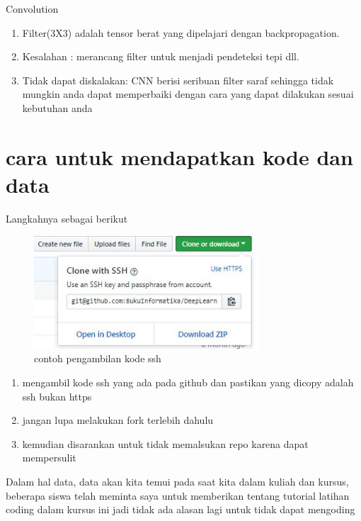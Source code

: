 Convolution
\begin{enumerate}
\item Filter(3X3) adalah tensor berat yang dipelajari dengan backpropagation.
\item Kesalahan : merancang filter untuk menjadi pendeteksi tepi dll.
\item Tidak dapat diskalakan: CNN berisi seribuan filter saraf sehingga tidak mungkin anda dapat memperbaiki dengan cara yang dapat dilakukan sesuai kebutuhan anda
\end{enumerate}

\section{cara untuk mendapatkan kode dan data}
Langkahnya sebagai berikut
\begin{figure}[!htp]
	\includegraphics[width=0.75\textwidth]{figures/ssh.JPG}
	\caption{contoh pengambilan kode ssh}
	\label{labelgambar}
\end{figure}

\begin{enumerate}
\item mengambil kode ssh yang ada pada github dan pastikan yang dicopy adalah ssh bukan https
\item jangan lupa melakukan fork terlebih dahulu
\item kemudian disarankan untuk tidak memalsukan repo karena dapat mempersulit 
\end{enumerate}

Dalam hal data, data akan kita temui pada saat kita dalam kuliah dan kursus, beberapa siswa telah meminta saya untuk memberikan 
tentang tutorial latihan coding dalam kursus ini jadi tidak ada alasan lagi untuk tidak dapat mengoding

